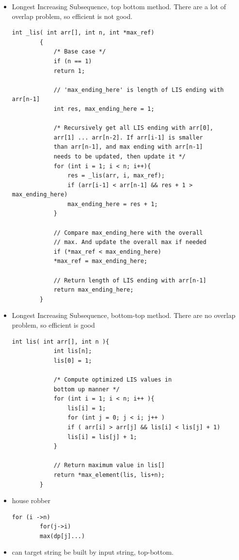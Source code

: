 \documentclass[a4paper,11pt,twoside]{book}
\begin{document}
\begin{itemize}
	
	\item Longest Increasing Subsequence, top bottom method. There are a lot of overlap problem, so efficient is not good.
	
	\begin{lstlisting}[numbers=none]
		int _lis( int arr[], int n, int *max_ref)
		{
			/* Base case */
			if (n == 1)
			return 1;
			
			// 'max_ending_here' is length of LIS ending with arr[n-1]
			int res, max_ending_here = 1;
			
			/* Recursively get all LIS ending with arr[0],
			arr[1] ... arr[n-2]. If arr[i-1] is smaller
			than arr[n-1], and max ending with arr[n-1]
			needs to be updated, then update it */
			for (int i = 1; i < n; i++){
				res = _lis(arr, i, max_ref);
				if (arr[i-1] < arr[n-1] && res + 1 > max_ending_here)
				max_ending_here = res + 1;
			}
			
			// Compare max_ending_here with the overall
			// max. And update the overall max if needed
			if (*max_ref < max_ending_here)
			*max_ref = max_ending_here;
			
			// Return length of LIS ending with arr[n-1]
			return max_ending_here;
		}
	\end{lstlisting}
	
	\item Longest Increasing Subsequence, bottom-top method. There are no overlap problem, so efficient is good
	
	\begin{lstlisting}[numbers=none]
		int lis( int arr[], int n ){
			int lis[n];
			lis[0] = 1;  
			
			/* Compute optimized LIS values in
			bottom up manner */
			for (int i = 1; i < n; i++ ){
				lis[i] = 1;
				for (int j = 0; j < i; j++ ) 
				if ( arr[i] > arr[j] && lis[i] < lis[j] + 1)
				lis[i] = lis[j] + 1;
			}
			
			// Return maximum value in lis[]
			return *max_element(lis, lis+n);
		}
	\end{lstlisting}
	
	
	\item house robber
	\begin{lstlisting}[numbers=none]
		for (i ->n)
		for(j->i)
		max(dp[j]...)
	\end{lstlisting}
	
	
	\item can target string be built by input string, top-bottom.
	

\end{itemize}
\end{document}
